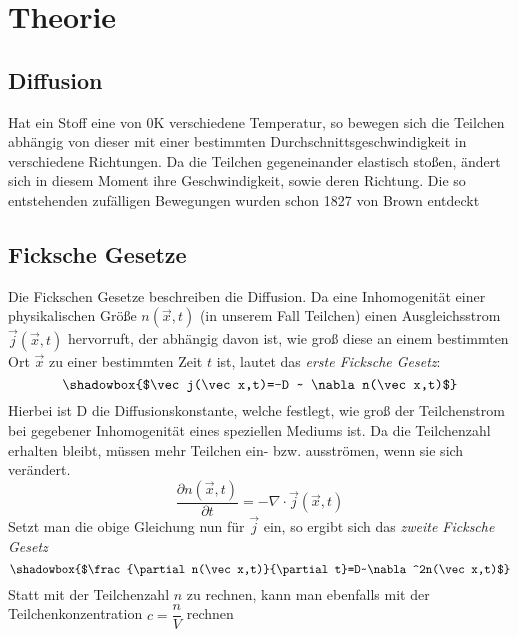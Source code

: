 \documentclass[12pt,a4paper,titlepage,headinclude,bibtotoc]{scrartcl}
\begin{document}
\section{Theorie}
\label{sec:theorie}
\subsection{Diffusion}
Hat ein Stoff eine von 0K verschiedene Temperatur, so bewegen sich die Teilchen abhängig von dieser mit einer bestimmten Durchschnittsgeschwindigkeit in verschiedene Richtungen.
Da die Teilchen gegeneinander elastisch stoßen, ändert sich in diesem Moment ihre Geschwindigkeit, sowie deren Richtung.
Die so entstehenden zufälligen Bewegungen wurden schon 1827 von Brown entdeckt \cite[S. 8]{demtroeder}

\subsection{Ficksche Gesetze}
Die Fickschen Gesetze beschreiben die Diffusion.
Da eine Inhomogenität einer physikalischen Größe $n(\vec x,t)$ (in unserem Fall Teilchen) einen Ausgleichsstrom $\vec j(\vec x,t)$ hervorruft, der abhängig davon ist, wie groß diese an einem bestimmten Ort $\vec x$ zu einer bestimmten Zeit $t$ ist, lautet das \emph{erste Ficksche Gesetz}:
$$\shadowbox{$\vec j(\vec x,t)=-D ~ \nabla n(\vec x,t)$}$$
Hierbei ist D die Diffusionskonstante, welche festlegt, wie groß der Teilchenstrom bei gegebener Inhomogenität eines speziellen Mediums ist.
Da die Teilchenzahl erhalten bleibt, müssen mehr Teilchen ein- bzw. ausströmen, wenn sie sich verändert.
$$\frac{\partial n(\vec x,t)}{\partial t}=-\nabla\cdot \vec j(\vec x,t)$$
Setzt man die obige Gleichung nun für $\vec j$ ein, so ergibt sich das \emph{zweite Ficksche Gesetz}
$$\shadowbox{$\frac{\partial n(\vec x,t)}{\partial t}=D~\nabla^2n(\vec x,t)$}$$
Statt mit der Teilchenzahl $n$ zu rechnen, kann man ebenfalls mit der Teilchenkonzentration $c=\dfrac{n}{V}$ rechnen
\end{document}
